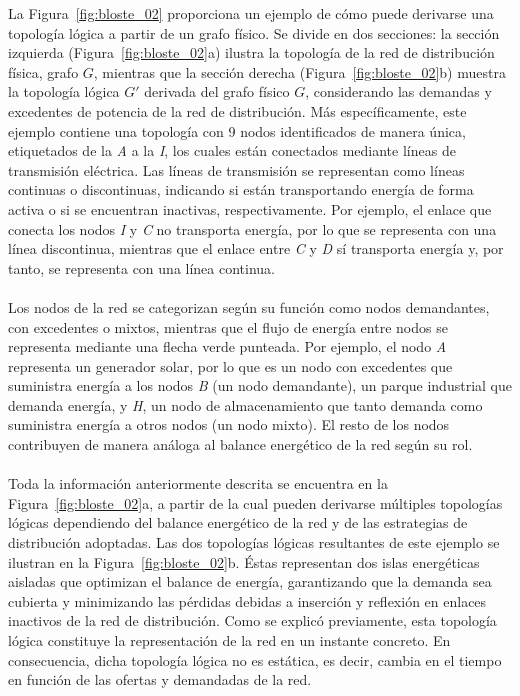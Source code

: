 La Figura~\ref{fig:bloste_02} proporciona un ejemplo de cómo puede derivarse una topología lógica a partir de un grafo físico. Se divide en dos secciones: la sección izquierda (Figura~\ref{fig:bloste_02}a) ilustra la topología de la red de distribución física, grafo \(G\), mientras que la sección derecha (Figura~\ref{fig:bloste_02}b) muestra la topología lógica \(G'\) derivada del grafo físico \(G\), considerando las demandas y excedentes de potencia de la red de distribución. Más específicamente, este ejemplo contiene una topología con 9 nodos identificados de manera única, etiquetados de la \textit{A} a la \textit{I}, los cuales están conectados mediante líneas de transmisión eléctrica. Las líneas de transmisión se representan como líneas continuas o discontinuas, indicando si están transportando energía de forma activa o si se encuentran inactivas, respectivamente. Por ejemplo, el enlace que conecta los nodos \textit{I} y \textit{C} no transporta energía, por lo que se representa con una línea discontinua, mientras que el enlace entre \textit{C} y \textit{D} sí transporta energía y, por tanto, se representa con una línea continua. \\
\\
Los nodos de la red se categorizan según su función como nodos demandantes, con excedentes o mixtos, mientras que el flujo de energía entre nodos se representa mediante una flecha verde punteada. Por ejemplo, el nodo \textit{A} representa un generador solar, por lo que es un nodo con excedentes que suministra energía a los nodos \textit{B} (un nodo demandante), un parque industrial que demanda energía, y \textit{H}, un nodo de almacenamiento que tanto demanda como suministra energía a otros nodos (un nodo mixto). El resto de los nodos contribuyen de manera análoga al balance energético de la red según su rol.\\
\\
Toda la información anteriormente descrita se encuentra en la Figura~\ref{fig:bloste_02}a, a partir de la cual pueden derivarse múltiples topologías lógicas dependiendo del balance energético de la red y de las estrategias de distribución adoptadas. Las dos topologías lógicas resultantes de este ejemplo se ilustran en la Figura~\ref{fig:bloste_02}b. Éstas representan dos islas energéticas aisladas que optimizan el balance de energía, garantizando que la demanda sea cubierta y minimizando las pérdidas debidas a inserción y reflexión en enlaces inactivos de la red de distribución. Como se explicó previamente, esta topología lógica constituye la representación de la red en un instante concreto. En consecuencia, dicha topología lógica no es estática, es decir, cambia en el tiempo en función de las ofertas y demandadas de la red.\\
